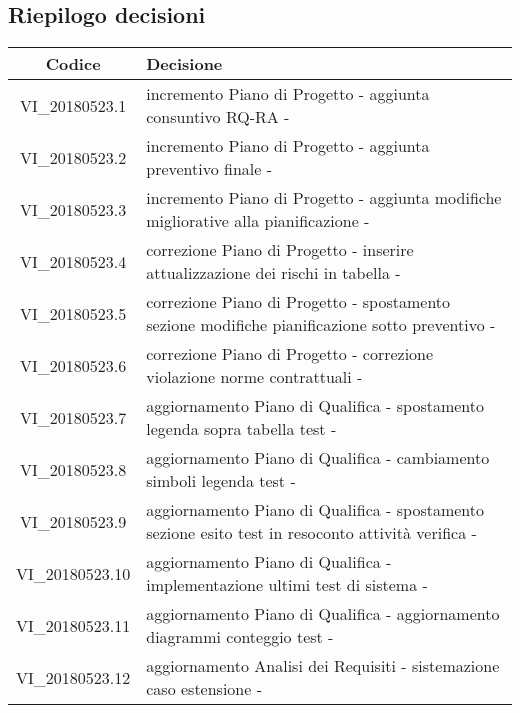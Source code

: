 \subsection{Riepilogo decisioni}

\begin{center}
    \begin{tabular}{c | p{11cm}}
        \centering
        \rowcolor[gray]{.9} { \textbf{Codice} } & { \textbf{Decisione} } \\ 
        \hline
        \rowcolor[gray]{.8} VI\_20180523.1 & incremento Piano di Progetto - aggiunta consuntivo RQ-RA - \Tommaso{} \\
        \rowcolor[gray]{.9} VI\_20180523.2 & incremento Piano di Progetto - aggiunta preventivo finale - \Tommaso{} \\
        \rowcolor[gray]{.8} VI\_20180523.3 & incremento Piano di Progetto - aggiunta modifiche migliorative alla pianificazione - \Tommaso{} \\
        \rowcolor[gray]{.9} VI\_20180523.4 & correzione Piano di Progetto - inserire attualizzazione dei rischi in tabella - \Tommaso{} \\
        \rowcolor[gray]{.8} VI\_20180523.5 & correzione Piano di Progetto - spostamento sezione modifiche pianificazione sotto preventivo - \Tommaso{} \\
        \rowcolor[gray]{.9} VI\_20180523.6 & correzione Piano di Progetto - correzione violazione norme contrattuali - \Tommaso{} \\
        \rowcolor[gray]{.8} VI\_20180523.7 & aggiornamento Piano di Qualifica - spostamento legenda sopra tabella test - \Luca{} \\
        \rowcolor[gray]{.9} VI\_20180523.8 & aggiornamento Piano di Qualifica - cambiamento simboli legenda test - \Luca{} \\
        \rowcolor[gray]{.8} VI\_20180523.9 & aggiornamento Piano di Qualifica - spostamento sezione esito test in resoconto attività verifica - \Luca{} \\
        \rowcolor[gray]{.9} VI\_20180523.10 & aggiornamento Piano di Qualifica - implementazione ultimi test di sistema - \Tommaso{} \\
        \rowcolor[gray]{.8} VI\_20180523.11 & aggiornamento Piano di Qualifica - aggiornamento diagrammi conteggio test - \Luca{} \\
        \rowcolor[gray]{.9} VI\_20180523.12 & aggiornamento Analisi dei Requisiti - sistemazione caso estensione - \Mattia{} \\

\end{tabular}
\end{center}
